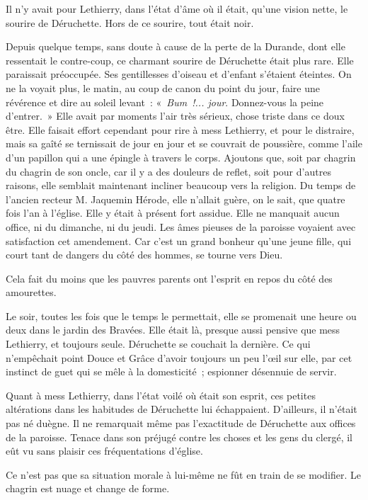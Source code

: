 \documentclass[french,twoside]{book} %
\begin{document}
Il n’y avait pour Lethierry, dans l’état d’âme où il était, qu’une vision nette, le sourire de Déruchette. Hors de ce sourire, tout était noir.\par
 Depuis quelque temps, sans doute à cause de la perte de la Durande, dont elle ressentait le contre-coup, ce charmant sourire de Déruchette était plus rare. Elle paraissait préoccupée. Ses gentillesses d’oiseau et d’enfant s’étaient éteintes. On ne la voyait plus, le matin, au coup de canon du point du jour, faire une révérence et dire au soleil levant : « \emph{Bum !... jour}. Donnez-vous la peine d’entrer. » Elle avait par moments l’air très sérieux, chose triste dans ce doux être. Elle faisait effort cependant pour rire à mess Lethierry, et pour le distraire, mais sa gaîté se ternissait de jour en jour et se couvrait de poussière, comme l’aile d’un papillon qui a une épingle à travers le corps. Ajoutons que, soit par chagrin du chagrin de son oncle, car il y a des douleurs de reflet, soit pour d’autres raisons, elle semblait maintenant incliner beaucoup vers la religion. Du temps de l’ancien recteur M. Jaquemin Hérode, elle n’allait guère, on le sait, que quatre fois l’an à l’église. Elle y était à présent fort assidue. Elle ne manquait aucun office, ni du dimanche, ni du jeudi. Les âmes pieuses de la paroisse voyaient avec satisfaction cet amendement. Car c’est un grand bonheur qu’une jeune fille, qui court tant de dangers du côté des hommes, se tourne vers Dieu.\par
Cela fait du moins que les pauvres parents ont l’esprit en repos du côté des amourettes.\par
Le soir, toutes les fois que le temps le permettait, elle se promenait une heure ou deux dans le jardin des Bravées. Elle était là, presque aussi pensive que mess Lethierry, et toujours seule. Déruchette se  couchait la dernière. Ce qui n’empêchait point Douce et Grâce d’avoir toujours un peu l’œil sur elle, par cet instinct de guet qui se mêle à la domesticité ; espionner désennuie de servir.\par
Quant à mess Lethierry, dans l’état voilé où était son esprit, ces petites altérations dans les habitudes de Déruchette lui échappaient. D’ailleurs, il n’était pas né duègne. Il ne remarquait même pas l’exactitude de Déruchette aux offices de la paroisse. Tenace dans son préjugé contre les choses et les gens du clergé, il eût vu sans plaisir ces fréquentations d’église.\par
Ce n’est pas que sa situation morale à lui-même ne fût en train de se modifier. Le chagrin est nuage et change de forme.\par
\end{document}
